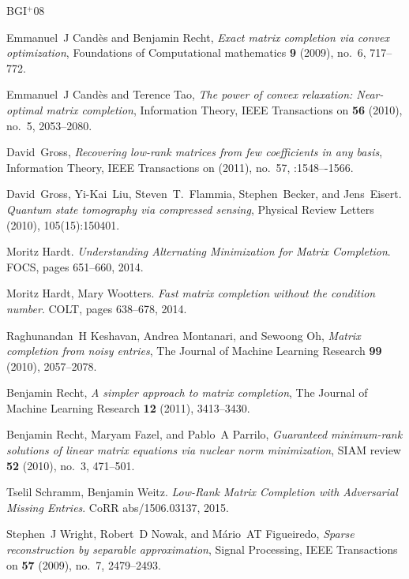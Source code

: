 \documentclass[11pt]{article}
\begin{document}


\newcommand{\etalchar}[1]{$^{#1}$}
\begin{thebibliography}{BGI{\etalchar{+}}08}
  
Emmanuel~J Cand{\`e}s and Benjamin Recht, \emph{Exact matrix completion via
  convex optimization}, Foundations of Computational mathematics \textbf{9}
  (2009), no.~6, 717--772.

Emmanuel~J Cand{\`e}s and Terence Tao, \emph{The power of convex relaxation:
  Near-optimal matrix completion}, Information Theory, IEEE Transactions on
  \textbf{56} (2010), no.~5, 2053--2080.

David~Gross, \emph{Recovering low-rank matrices from few coefficients in any basis}, Information Theory, IEEE Transactions on (2011), no.~57, :1548–-1566.

David~Gross, Yi-Kai~Liu, Steven~T.~Flammia, Stephen~Becker, and Jens~Eisert. \emph{Quantum state tomography via compressed sensing}, Physical Review Letters (2010), 105(15):150401.

Moritz Hardt. \emph{Understanding Alternating Minimization for Matrix Completion}. FOCS, pages 651--660, 2014.

Moritz Hardt, Mary Wootters. \emph{Fast matrix completion without the condition number}. COLT, pages 638--678, 2014.


Raghunandan~H Keshavan, Andrea Montanari, and Sewoong Oh, \emph{Matrix
  completion from noisy entries}, The Journal of Machine Learning Research
  \textbf{99} (2010), 2057--2078.

Benjamin Recht, \emph{A simpler approach to matrix completion}, The Journal of
  Machine Learning Research \textbf{12} (2011), 3413--3430.

Benjamin Recht, Maryam Fazel, and Pablo~A Parrilo, \emph{Guaranteed
  minimum-rank solutions of linear matrix equations via nuclear norm
  minimization}, SIAM review \textbf{52} (2010), no.~3, 471--501.

Tselil Schramm, Benjamin Weitz. \emph{Low-Rank Matrix Completion with Adversarial Missing Entries}. CoRR abs/1506.03137, 2015.

Stephen~J Wright, Robert~D Nowak, and M{\'a}rio~AT Figueiredo, \emph{Sparse
  reconstruction by separable approximation}, Signal Processing, IEEE
  Transactions on \textbf{57} (2009), no.~7, 2479--2493.

\end{thebibliography}
\end{document}
